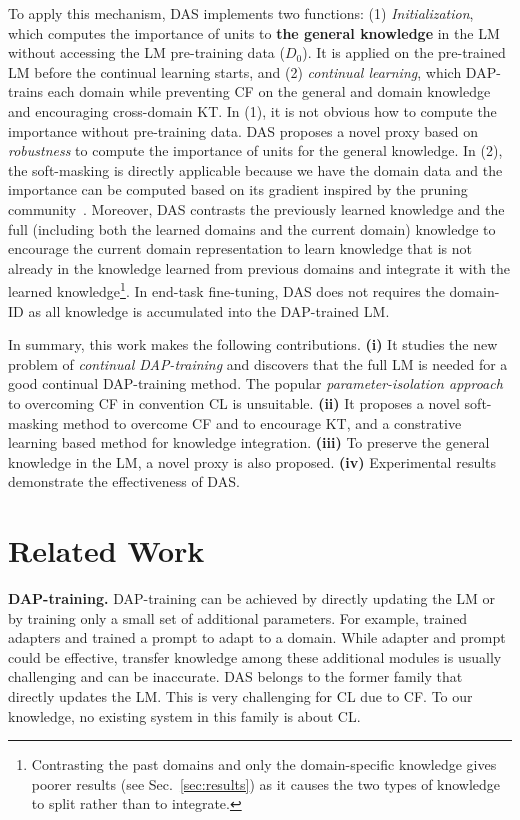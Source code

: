 \documentclass{article} \usepackage{iclr2023_conference,times}
\begin{document}
To apply this mechanism, DAS implements two functions: (1) \textit{Initialization}, which computes the importance of units to \textbf{the general knowledge} in the LM without accessing the LM pre-training data ($D_0$). It is applied on the pre-trained LM before the continual learning starts, and (2) \textit{continual learning}, which DAP-trains each domain while preventing CF on the general and domain knowledge and encouraging cross-domain KT.
In (1), it is not obvious how to compute the importance without pre-training data. DAS proposes a novel proxy based on \textit{robustness} to compute the importance of units for the general knowledge. In (2), the soft-masking is directly applicable because we have the domain data and the importance can be computed based on its gradient inspired by the pruning community~\citep{li2021differentiable,michel2019sixteen}. Moreover, DAS contrasts the previously learned knowledge and the full (including both the learned domains and the current domain) knowledge to encourage the current domain representation to learn knowledge that is not already in the knowledge learned from previous domains and integrate it with the learned knowledge\footnote{Contrasting the past domains and only the domain-specific knowledge gives poorer results (see Sec.~\ref{sec:results}) as it causes the two types of knowledge to split rather than to integrate.}. In end-task fine-tuning, DAS does not requires the domain-ID as all knowledge is accumulated into the DAP-trained LM.






In summary, this work makes the following contributions. 
\textbf{(i)} It studies the new problem of \textit{continual DAP-training} and  
discovers that the full LM is needed for a good continual DAP-training method. The popular \textit{parameter-isolation approach} to overcoming CF in convention CL is unsuitable.
\textbf{(ii)} It proposes a novel soft-masking method to overcome CF and to encourage KT, and a constrative learning based method for knowledge integration.  \textbf{(iii)} To preserve the general knowledge in the LM, a novel proxy is also proposed.
\textbf{(iv)} Experimental results demonstrate the effectiveness of DAS. 

{\color{black}
\section{Related Work}
\label{sec:related}
\textbf{DAP-training.} DAP-training 
can be achieved by directly updating the LM \citep{DBLP:conf/naacl/XuLSY19,sun2019fine,lee2020biobert,alsentzer2019publicly,DBLP:conf/acl/GururanganMSLBD20,chakrabarty2019imho,ke2022dga} or by training only a small set of additional parameters. For example, \cite{pfeiffer2020adapterfusion,wang2020k,ke2021achieving,ke2021Classic,ke2021adapting} trained adapters and \cite{gu2021ppt} trained a prompt to adapt to a domain. While adapter and prompt could be effective, transfer knowledge among these additional modules is usually challenging and can be inaccurate. DAS belongs to the former family that directly updates the LM. This is very challenging for CL due to CF. To our knowledge, no existing system in this family is about CL. }
\end{document}
